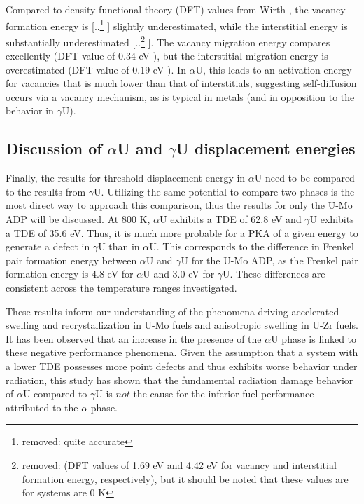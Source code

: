 \documentclass[review]{elsarticle}
\providecommand{\DIFaddtex}[1]{{\protect\color{blue} \sf #1}} %
\providecommand{\DIFdeltex}[1]{{\protect\color{red} [..\footnote{removed: #1} ]}} %
\providecommand{\DIFaddbegin}{} %
\providecommand{\DIFaddend}{} %
\providecommand{\DIFdelbegin}{} %
\providecommand{\DIFdelend}{} %
\providecommand{\DIFadd}[1]{\texorpdfstring{\DIFaddtex{#1}}{#1}} %
\providecommand{\DIFdel}[1]{\texorpdfstring{\DIFdeltex{#1}}{}} %
\newcommand{\DIFscaledelfig}{0.5}
\newlength{\DIFdelgraphicswidth} %
\newlength{\DIFdelgraphicsheight} %
\newcommand{\DIFaddincludegraphics}[2][]{{\color{blue}\fbox{\DIFOincludegraphics[#1]{#2}}}} %
\newcommand{\DIFdelincludegraphics}[2][]{%
\sbox{\DIFdelgraphicsbox}{\DIFOincludegraphics[#1]{#2}}%
\settoboxwidth{\DIFdelgraphicswidth}{\DIFdelgraphicsbox} %
\settoboxtotalheight{\DIFdelgraphicsheight}{\DIFdelgraphicsbox} %
\scalebox{\DIFscaledelfig}{%
\parbox[b]{\DIFdelgraphicswidth}{\usebox{\DIFdelgraphicsbox}\\[-\baselineskip] \rule{\DIFdelgraphicswidth}{0em}}\llap{\resizebox{\DIFdelgraphicswidth}{\DIFdelgraphicsheight}{%
\setlength{\unitlength}{\DIFdelgraphicswidth}%
\begin{picture}(1,1)%
\thicklines\linethickness{2pt} %
{\color[rgb]{1,0,0}\put(0,0){\framebox(1,1){}}}%
{\color[rgb]{1,0,0}\put(0,0){\line( 1,1){1}}}%
{\color[rgb]{1,0,0}\put(0,1){\line(1,-1){1}}}%
\end{picture}%
}\hspace*{3pt}}} %
} %
\DeclareRobustCommand{\DIFaddbegin}{\DIFOaddbegin \let\includegraphics\DIFaddincludegraphics} %
\DeclareRobustCommand{\DIFaddend}{\DIFOaddend \let\includegraphics\DIFOincludegraphics} %
\DeclareRobustCommand{\DIFdelbegin}{\DIFOdelbegin \let\includegraphics\DIFdelincludegraphics} %
\DeclareRobustCommand{\DIFdelend}{\DIFOaddend \let\includegraphics\DIFOincludegraphics} %
\begin{document}
Compared to density functional theory (DFT) values from Wirth \cite{wirth2011}, the vacancy formation energy is \DIFdelbegin \DIFdel{quite accurate}\DIFdelend \DIFaddbegin \DIFadd{slightly underestimated}\DIFaddend , while the interstitial energy is substantially underestimated\DIFdelbegin \DIFdel{(DFT values of 1.69 eV and 4.42 eV for vacancy and interstitial formation energy, respectively), but it should be noted that these values are for systems are 0 K}\DIFdelend . The vacancy migration energy compares excellently (DFT value of 0.34 eV \DIFaddbegin \DIFadd{\cite{wirth2011}}\DIFaddend ), but the interstitial migration energy is overestimated (DFT value of 0.19 eV \DIFaddbegin \DIFadd{\cite{wirth2011}}\DIFaddend ). In $\alpha$U, this leads to an activation energy for vacancies that is much lower than that of interstitials, suggesting self-diffusion occurs via a vacancy mechanism, as is typical in metals (and in opposition to the behavior in $\gamma$U). 

\subsection{Discussion of $\alpha$U and $\gamma$U displacement energies}

Finally, the results for \DIFaddbegin \DIFadd{threshold }\DIFaddend displacement energy in $\alpha$U need to be compared to the results from $\gamma$U. Utilizing the same potential to compare two phases is the most direct way to approach this comparison, thus the results for only the U-Mo ADP will be discussed. At 800 K, $\alpha$U exhibits a TDE of 62.8 eV and $\gamma$U exhibits a TDE of 35.6 eV. Thus, it is much more probable for a PKA of a given energy to generate a defect in $\gamma$U than in $\alpha$U. This corresponds to the difference in Frenkel pair formation energy between $\alpha$U and $\gamma$U for the U-Mo ADP, as the Frenkel pair formation energy is 4.8 eV for $\alpha$U and 3.0 eV for $\gamma$U. These differences are consistent across the temperature ranges investigated.

These results inform our understanding of the phenomena driving accelerated swelling and recrystallization in U-Mo fuels and anisotropic swelling in U-Zr fuels. It has been observed that an increase in the presence of the $\alpha$U phase is linked to these negative performance phenomena. Given the assumption that a system with a lower TDE possesses more point defects and thus exhibits worse behavior under radiation, this study has shown that the fundamental radiation damage behavior of $\alpha$U compared to $\gamma$U is $\textit{not}$ the cause for the inferior fuel performance attributed to the $\alpha$ phase.
\end{document}
